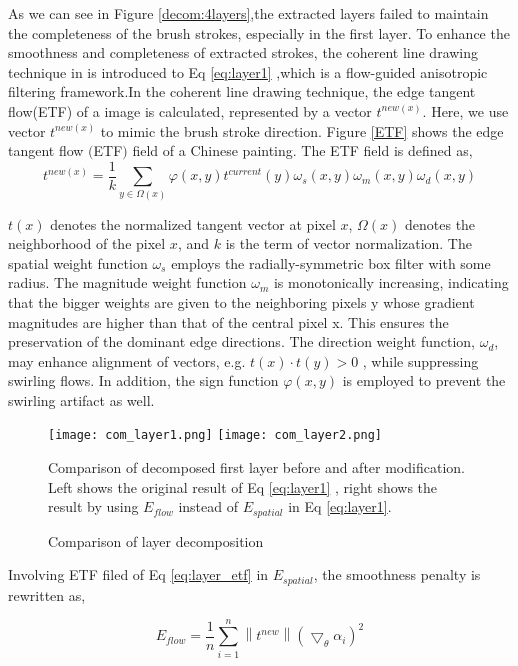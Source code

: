 As we can see in Figure \ref{decom:4layers},the extracted layers failed to maintain the completeness of the brush strokes, especially in the first layer. To enhance the smoothness and completeness of extracted strokes, the coherent line drawing technique in \cite{kang2007coherent} is introduced to Eq \ref{eq:layer1} ,which is a flow-guided anisotropic filtering framework.In the coherent line drawing technique, the edge tangent flow(ETF) of a image is calculated, represented by a vector $t^{new(x)} $. Here, we use vector $t^{new(x)} $ to mimic the brush stroke direction.  Figure \ref{ETF} shows the edge tangent flow $($ETF$)$ field of a Chinese painting.\newline
The ETF field is defined as,
\begin{equation}
 t^{new(x)}=\frac{1}{k}\sum_{y\in\Omega(x)} \varphi(x,y)t^{current}(y)\omega_{s}(x,y)\omega_{m}(x,y)\omega_{d}(x,y)
 \label{eq:layer_etf} 
\end{equation}

$t(x)$ denotes the normalized tangent vector at pixel $x$, $\Omega(x)$ denotes the neighborhood of the pixel $x$, and $k$ is the term of vector normalization. The spatial weight function $\omega_{s}$ employs the radially-symmetric box filter with some radius. The magnitude weight function $\omega_{m}$ is monotonically increasing, indicating that the bigger weights are given to the neighboring pixels y whose gradient magnitudes are higher than that of the central pixel x. This ensures the preservation of the dominant edge directions. The direction weight function, $\omega_{d}$, may enhance alignment of vectors, e.g. $t(x)\cdot t(y)>0$ , while suppressing swirling flows. In addition, the sign function $\varphi(x,y)$  is employed to prevent the swirling artifact as well.

\begin{figure}[H]
	\centering
	\texttt{[image: com\_layer1.png]}
	\texttt{[image: com\_layer2.png]}
	\caption{Comparison of layer decomposition  }
	\label{com eflow}
	\medskip
	\small
	Comparison of decomposed first layer before and after modification. Left shows the original result of Eq \ref{eq:layer1} , right shows the result by using $E_{flow}$ instead of $E_{spatial}$ in Eq \ref{eq:layer1}.
\end{figure}

Involving ETF filed of Eq \ref{eq:layer_etf} in $E_{spatial}$, the smoothness penalty is rewritten as,

\begin{equation} 
E_{flow}=\frac{1}{n} \sum_{i=1}^{n} \left \| t^{new} \right \| \left ( \bigtriangledown_{\theta}\alpha_{i} \right )^2 
\end{equation} 

